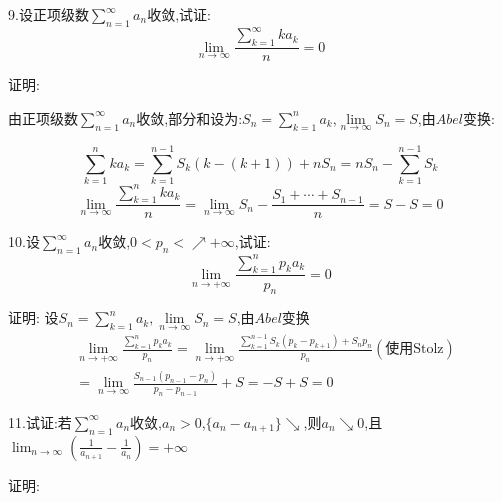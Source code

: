 \documentclass{ctexart}
\begin{document}
 \begin{tcolorbox}[title = {综合性问题},colbacktitle=red!25!white,colback=white,arc = 2mm, outer arc = 2mm,fonttitle = \itshape, fontupper = \itshape, fontlower = \itshape]
 	   	9.设正项级数$\displaystyle{\sum_{n=1}^{\infty}a_{n}}$收敛,试证:
 	$$\lim_{n \to \infty}\frac{\sum\limits_{k=1}^{\infty}ka_{k}}{n}=0$$
 	\begin{tcolorbox}[colback=white,arc = 1mm, outer arc = 1mm,fonttitle = \itshape, fontupper = \itshape, fontlower = \itshape]
 		{\color{red}证明:}
 		
 		由正项级数$\displaystyle{\sum_{n=1}^{\infty}a_{n}}$收敛,部分和设为:$S_{n}=\sum\limits_{k=1}^{n}a_{k}$,$\lim\limits_{n \to \infty}S_{n}=S$,由$Abel$变换:
 		
 		$$\sum\limits_{k=1}^{n}ka_{k}=\sum\limits_{k=1}^{n-1}S_{k}\left(k-\left(k+1 \right)  \right)+nS_{n}=nS_{n}-\sum\limits_{k=1}^{n-1}S_{k}$$
 		$$\lim_{n \to \infty}\frac{\sum\limits_{k=1}^{n}ka_{k}}{n}=\lim_{n \to \infty}S_{n}-\frac{S_{1}+\cdots+S_{n-1}}{n}=S-S=0$$
 	\end{tcolorbox}
 	10.设$\displaystyle{\sum_{n=1}^{\infty}a_{n}}$收敛,$0 < p_{n} < \nearrow +\infty$,试证:
 	$$\lim\limits_{n \to +\infty} \frac{\sum\limits_{k=1}^{n}p_{k}a_{k}}{p_{n}}=0$$
 	 \begin{tcolorbox}[colback=white,arc = 1mm, outer arc = 1mm,fonttitle = \itshape, fontupper = \itshape, fontlower = \itshape]
 		{\color{red}证明:}
 		设$\displaystyle{S_{n}=\sum_{k=1}^{n}a_{k}},\lim\limits_{n \to \infty}S_{n}=S$,由$Abel$变换       
 		$$
 		\begin{aligned}
 			&\lim\limits_{n \to +\infty} \frac{\sum\limits_{k=1}^{n}p_{k}a_{k}}{p_{n}}
 			= \lim\limits_{n \to +\infty} \frac{\sum\limits_{k=1}^{n-1}S_{k}\left(p_{k}-p_{k+1} \right)+S_{n}p_{n} }{p_{n}}\left(\text{使用Stolz} \right) \\
 			&=\lim_{n \to \infty }\frac{S_{n-1}\left(p_{n-1}-p_{n} \right)}{p_{n}-p_{n-1}}+S=-S+S=0
 		\end{aligned}
 		$$   
 	\end{tcolorbox}
 	11.试证:若$\displaystyle{\sum\limits_{n=1}^{\infty}a_{n}}$收敛,$a_{n} > 0$,$\{a_{n}-a_{n+1}\} \searrow $,则$a_{n} \searrow 0 $,且
 $\displaystyle{\lim_{n \to \infty }\left(\frac{1}{a_{n+1}}-\frac{1}{a_{n}} \right) =+\infty} $
 	 	\begin{tcolorbox}[colback=white,arc = 1mm, outer arc = 1mm,fonttitle = \itshape, fontupper = \itshape, fontlower = \itshape]
 		{\color{red}证明:}
 		

\end{tcolorbox}
\end{tcolorbox}
\end{document}
